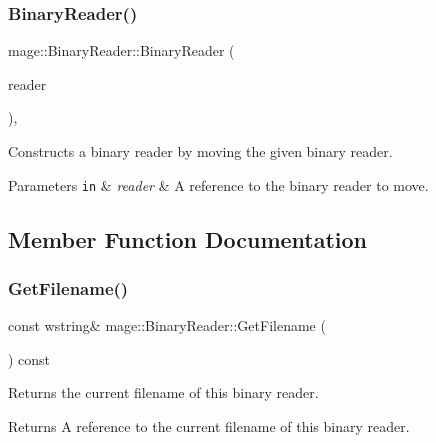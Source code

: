 \subsubsection{\texorpdfstring{Binary\+Reader()}{BinaryReader()}\hspace{0.1cm}{\footnotesize\ttfamily [3/3]}}
{\footnotesize\ttfamily mage\+::\+Binary\+Reader\+::\+Binary\+Reader (\begin{DoxyParamCaption}\item[{\hyperlink{classmage_1_1_binary_reader}{Binary\+Reader} \&\&}]{reader }\end{DoxyParamCaption})\hspace{0.3cm}{\ttfamily [protected]}, {\ttfamily [default]}}

Constructs a binary reader by moving the given binary reader.


\begin{DoxyParams}[1]{Parameters}
\mbox{\tt in}  & {\em reader} & A reference to the binary reader to move. \\
\hline
\end{DoxyParams}


\subsection{Member Function Documentation}
\hypertarget{classmage_1_1_binary_reader_a10a0ec56fe7f8e63964ffca2afe019a3}{}\label{classmage_1_1_binary_reader_a10a0ec56fe7f8e63964ffca2afe019a3} 
\subsubsection{\texorpdfstring{Get\+Filename()}{GetFilename()}}
{\footnotesize\ttfamily const wstring\& mage\+::\+Binary\+Reader\+::\+Get\+Filename (\begin{DoxyParamCaption}{ }\end{DoxyParamCaption}) const}

Returns the current filename of this binary reader.

\begin{DoxyReturn}{Returns}
A reference to the current filename of this binary reader. 
\end{DoxyReturn}
\hypertarget{classmage_1_1_binary_reader_a35b10713dca7a416b73b28d5f6aaf600}{}\label{classmage_1_1_binary_reader_a35b10713dca7a416b73b28d5f6aaf600} 
